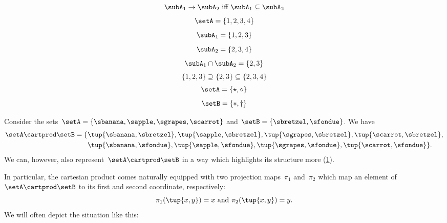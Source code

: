 {\begin{forslides}
\begin{equation}
			\label{eq:prod-slides-15}
			\subA_1 \to \subA_2 \text{ iff } \subA_1 \subseteq \subA_2
		\end{equation}
		\begin{equation}
			\label{eq:prod-slides-16}
			\setA = \{ 1, 2, 3, 4 \}
		\end{equation}
		\begin{equation}
			\label{eq:prod-slides-17}
			\subA_1 = \{ 1, 2, 3 \}
		\end{equation}
		\begin{equation}
			\label{eq:prod-slides-18}
			\subA_2 = \{2, 3, 4 \}
		\end{equation}
		\begin{equation}
			\label{eq:prod-slides-19}
			\subA_1 \cap \subA_2 = \{2, 3 \}
		\end{equation}
		\begin{equation}
			\label{eq:prod-slides-20}
			\{ 1, 2, 3 \} \supseteq \{2, 3 \} \subseteq \{2, 3, 4 \}
		\end{equation}
		\begin{equation}
			\label{eq:coprod-slides-1}
			\setA=\{\star, \diamond\}
		\end{equation}
		\begin{equation}
			\label{eq:coprod-slides-2}
			\setB=\{\ast, \dagger\}
		\end{equation}
	\end{forslides}
}

\begin{example}
	Consider the sets~$\setA = \{\sbanana, \sapple, \sgrapes, \scarrot\}$ and $\setB = \{ \sbretzel, \sfondue \}$.
	We have
	\begin{equation}
		\label{eq:cart-prod-example}
		\begin{aligned}
			\setA \cartprod \setB = \{ & \tup{\sbanana, \sbretzel}, \tup{\sapple, \sbretzel}, \tup{\sgrapes, \sbretzel}, \tup{\scarrot, \sbretzel}, \\
			                           & \tup{\sbanana,\sfondue}, \tup{\sapple, \sfondue}, \tup{\sgrapes, \sfondue}, \tup{\scarrot, \sfondue} \}.
		\end{aligned}
	\end{equation}
	We can, however, also represent~$\setA \cartprod \setB$ in a way which highlights its structure more (\cref{fig:example_cartesian}).
	\begin{figure}[h]
		\centering
		\caption{}
		\label{fig:example_cartesian}
	\end{figure}
	In particular, the cartesian product comes naturally equipped with two projection maps~$\pi_1$ and~$\pi_2$ which map an element of~$\setA \cartprod \setB$ to its first and second coordinate, respectively:
	\begin{equation}
		\pi_1(\tup{x,y}) =  x \text{ and } \pi_2(\tup{x,y}) = y.
	\end{equation}
	We will often depict the situation like this:
\end{example}
\begin{figure}[h!
	]
	\centering
	\caption{}
	\label{fig:diagram_cartesian_2}
\end{figure}

